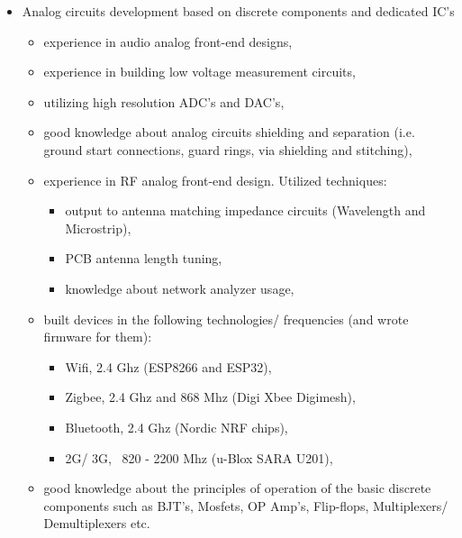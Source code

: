 \documentclass{tccv}
\begin{document}
\begin{itemize}
	\item Analog circuits development based on discrete components and dedicated IC's
	\begin{itemize}
		\item experience in audio analog front-end designs,
		\item experience in building low voltage measurement circuits,
		\item utilizing high resolution ADC's and DAC's,
		\item good knowledge about analog circuits shielding and separation (i.e. ground start connections, guard rings, via shielding and stitching),
		\item experience in RF analog front-end design. Utilized techniques: 
		\begin{itemize}
			\item output to antenna matching impedance circuits (Wavelength and Microstrip),
			\item PCB antenna length tuning,
			\item knowledge about network analyzer usage,
		\end{itemize}		 
		\item built devices in the following technologies/ frequencies (and wrote firmware for them):
		\begin{itemize}
			\item Wifi, 2.4 Ghz (ESP8266 and ESP32),
			\item Zigbee, 2.4 Ghz and 868 Mhz (Digi Xbee Digimesh),
			\item Bluetooth, 2.4 Ghz (Nordic NRF chips),
			\item 2G/ 3G, ~820 - 2200 Mhz (u-Blox SARA U201), 
		\end{itemize}
		\item good knowledge about the principles of operation of the basic discrete components such as BJT's, Mosfets, OP Amp's, Flip-flops, Multiplexers/ Demultiplexers etc.
	\end{itemize}
\end{itemize}
\end{document}
